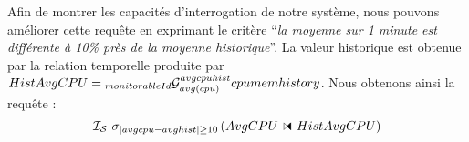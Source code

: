 Afin de montrer les capacités d'interrogation de notre système, nous pouvons améliorer cette requête en exprimant le critère \enquote{\it la moyenne sur 1 minute est différente à 10\% près de la moyenne historique}. La valeur historique est obtenue par la relation temporelle produite par $HistAvgCPU=\null_{monitorableId}\G_{avg(cpu)}^{avgcpuhist} cpumemhistory$. Nous obtenons ainsi la requête :
$$\IS\ \sigma_{\abs{avgcpu-avghist}\geq 10}\left(AvgCPU\ssjoin HistAvgCPU\right)$$
